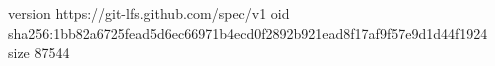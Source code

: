version https://git-lfs.github.com/spec/v1
oid sha256:1bb82a6725fead5d6ec66971b4ecd0f2892b921ead8f17af9f57e9d1d44f1924
size 87544
